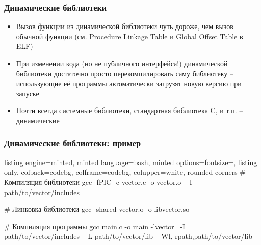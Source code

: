 \documentclass[10pt]{beamer}
\begin{document}
\begin{frame}[fragile]
\frametitle{Динамические библиотеки}
\begin{itemize}
\item Вызов функции из динамической библиотеки чуть дороже, чем вызов обычной функции (см. Procedure Linkage Table и Global Offset Table в ELF)
\pause
\item При изменении кода (но не публичного интерфейса!) динамической библиотеки достаточно просто перекомпилировать саму библиотеку -- использующие её программы автоматически загрузят новую версию при запуске
\pause
\item Почти всегда системные библиотеки, стандартная библиотека C, и т.п. -- динамические
\end{itemize}
\end{frame}

\begin{frame}[fragile]
\frametitle{Динамические библиотеки: пример}
\begin{tcblisting}{listing engine=minted, minted language=bash, minted options={fontsize=\scriptsize}, listing only, colback=codebg, colframe=codebg, colupper=white, rounded corners}
# Компиляция библиотеки
gcc -fPIC -c vector.c -o vector.o \
  -I path/to/vector/includes

# Линковка библиотеки
gcc -shared vector.o -o libvector.so

# Компиляция программы
gcc main.c -o main -lvector \
  -I path/to/vector/includes \
  -L path/to/vector/lib \
  -Wl,-rpath,path/to/vector/lib
\end{tcblisting}
\end{frame}
\end{document}
